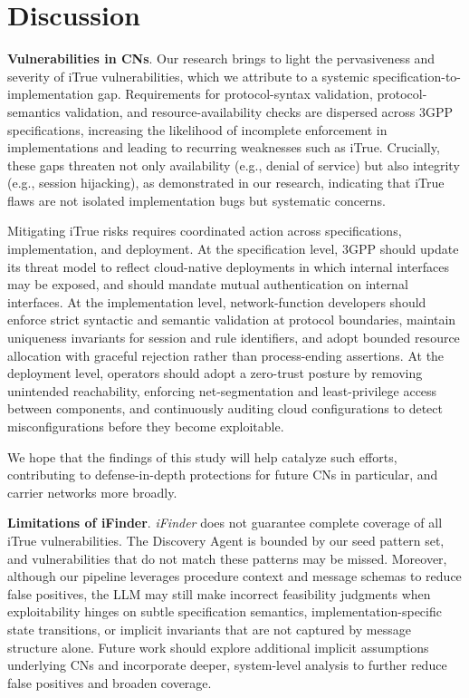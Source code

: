 \section{Discussion}

\noindent\textbf{Vulnerabilities in CNs}. Our research brings to light the pervasiveness and severity of iTrue vulnerabilities, which we attribute to a systemic specification-to-implementation gap. Requirements for protocol-syntax validation, protocol-semantics validation, and resource-availability checks are dispersed across 3GPP specifications, increasing the likelihood of incomplete enforcement in implementations and leading to recurring weaknesses such as iTrue. Crucially, these gaps threaten not only availability (e.g., denial of service) but also integrity (e.g., session hijacking), as demonstrated in our research, indicating that iTrue flaws are not isolated implementation bugs but systematic concerns.

Mitigating iTrue risks requires coordinated action across specifications, implementation, and deployment. At the specification level, 3GPP should update its threat model to reflect cloud-native deployments in which internal interfaces may be exposed, and should mandate mutual authentication on internal interfaces. At the implementation level, network-function developers should enforce strict syntactic and semantic validation at protocol boundaries, maintain uniqueness invariants for session and rule identifiers, and adopt bounded resource allocation with graceful rejection rather than process-ending assertions. At the deployment level, operators should adopt a zero-trust posture by removing unintended reachability, enforcing net-segmentation and least-privilege access between components, and continuously auditing cloud configurations to detect misconfigurations before they become exploitable.

We hope that the findings of this study will help catalyze such efforts, contributing to defense-in-depth protections for future CNs in particular, and carrier networks more broadly.

\vspace{2pt}\noindent\textbf{Limitations of iFinder}. 
\textit{iFinder} does not guarantee complete coverage of all iTrue vulnerabilities. The Discovery Agent is bounded by our seed pattern set, and vulnerabilities that do not match these patterns may be missed. Moreover, although our pipeline leverages procedure context and message schemas to reduce false positives, the LLM may still make incorrect feasibility judgments when exploitability hinges on subtle specification semantics, implementation-specific state transitions, or implicit invariants that are not captured by message structure alone. Future work should explore additional implicit assumptions underlying CNs and incorporate deeper, system-level analysis to further reduce false positives and broaden coverage.

